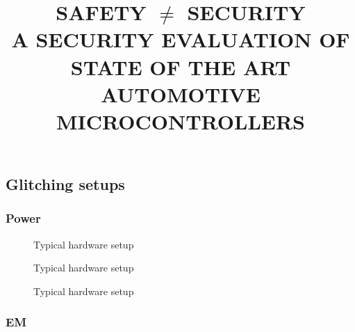 \documentclass[a4paper, 10pt]{article}
\title{SAFETY $\neq$ SECURITY \\ A SECURITY EVALUATION OF STATE OF THE ART AUTOMOTIVE MICROCONTROLLERS}
\author{}
\date{}
\begin{document}
  \maketitle

  
  \subsection{Glitching setups}

  \subsubsection{Power}

    \begin{figure}[H]
        \centering
        \def\svgwidth{\columnwidth}
        
        \caption{Typical hardware setup}
        \label{fig:fidiagram}
    \end{figure}
    \begin{figure}[H]
        \centering
        \def\svgwidth{\columnwidth}
        
        \caption{Typical hardware setup}
        \label{fig:fidiagram}
    \end{figure}
        \begin{figure}[H]
        \centering
        \def\svgwidth{\columnwidth}
        
        \caption{Typical hardware setup}
        \label{fig:fidiagram}
    \end{figure}

  \subsubsection{EM}
\end{document}
